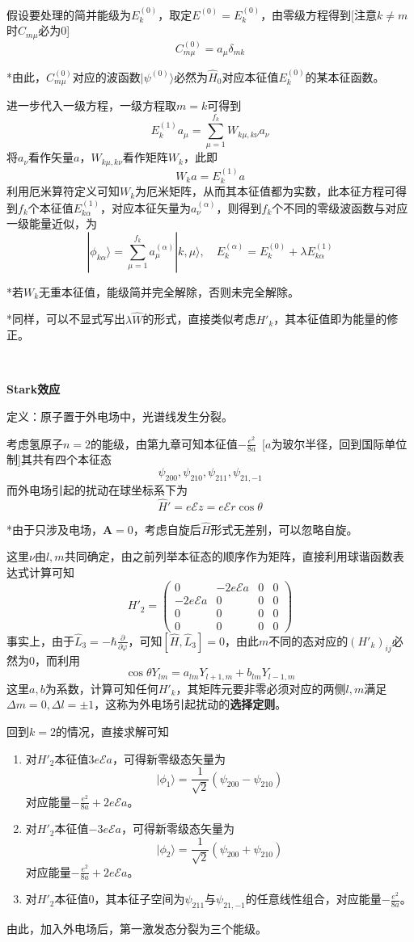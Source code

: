 \documentclass[a4paper,UTF8,fontset=windows]{ctexart}
\newcommand*{\ket}[1]{|#1\rangle}
\newcommand*{\ba}{\mathbf{A}}
\begin{document}
假设要处理的简并能级为$E_k^{(0)}$，取定$E^{(0)}=E_k^{(0)}$，由零级方程得到[注意$k\ne m$时$C_{m\mu}$必为0]
$$C_{m\mu}^{(0)}=a_\mu\delta_{mk}$$

*由此，$C_{m\mu}^{(0)}$对应的波函数$\ket{\psi^{(0)}}$必然为$\hat{H}_0$对应本征值$E_k^{(0)}$的某本征函数。

进一步代入一级方程，一级方程取$m=k$可得到
$$E_k^{(1)}a_\mu=\sum_{\mu=1}^{f_k}W_{k\mu,k\nu}a_\nu$$
将$a_\nu$看作矢量$a$，$W_{k\mu,k\nu}$看作矩阵$W_k$，此即
$$W_ka=E_k^{(1)}a$$
利用厄米算符定义可知$W_k$为厄米矩阵，从而其本征值都为实数，此本征方程可得到$f_k$个本征值$E_{k\alpha}^{(1)}$，对应本征矢量为$a_\nu^{(\alpha)}$，则得到$f_k$个不同的零级波函数与对应一级能量近似，为
$$\ket{\phi_{k\alpha}}=\sum_{\mu=1}^{f_k}a_\mu^{(\alpha)}\ket{k,\mu},\quad E_k^{(\alpha)}=E_k^{(0)}+\lambda E_{k\alpha}^{(1)}$$

*若$W_k$无重本征值，能级简并完全解除，否则未完全解除。

*同样，可以不显式写出$\lambda\hat{W}$的形式，直接类似考虑$H'_k$，其本征值即为能量的修正。

\

\textbf{Stark效应}

定义：原子置于外电场中，光谱线发生分裂。

考虑氢原子$n=2$的能级，由第九章可知本征值$-\frac{e^2}{8a}$\ [$a$为玻尔半径，回到国际单位制]其共有四个本征态
$$\psi_{200},\psi_{210},\psi_{211},\psi_{21,-1}$$
而外电场引起的扰动在球坐标系下为
$$\hat{H}'=e\mathcal{E}z=e\mathcal{E}r\cos\theta$$

*由于只涉及电场，$\ba=0$，考虑自旋后$\hat{H}$形式无差别，可以忽略自旋。

这里$\nu$由$l,m$共同确定，由之前列举本征态的顺序作为矩阵，直接利用球谐函数表达式计算可知
$$H'_2=\begin{pmatrix}0&-2e\mathcal{E}a&0&0\\-2e\mathcal{E}a&0&0&0\\0&0&0&0\\0&0&0&0\end{pmatrix}$$
事实上，由于$\hat{L}_3=-\hbar\frac{\partial}{\partial\varphi}$，可知$[\hat{H},\hat{L}_3]=0$，由此$m$不同的态对应的$(H'_k)_{ij}$必然为0，而利用$$\cos\theta Y_{lm}=a_{lm}Y_{l+1,m}+b_{lm}Y_{l-1,m}$$
这里$a,b$为系数，计算可知任何$H'_k$，其矩阵元要非零必须对应的两侧$l,m$满足$\Delta m=0,\Delta l=\pm1$，这称为外电场引起扰动的\textbf{选择定则}。

回到$k=2$的情况，直接求解可知
\begin{enumerate}
    \item 对$H'_2$本征值$3e\mathcal{E}a$，可得新零级态矢量为
    $$\ket{\phi_1}=\frac{1}{\sqrt2}(\psi_{200}-\psi_{210})$$
    对应能量$-\frac{e^2}{8a}+2e\mathcal{E}a$。

    \item 对$H'_2$本征值$-3e\mathcal{E}a$，可得新零级态矢量为
    $$\ket{\phi_2}=\frac{1}{\sqrt2}(\psi_{200}+\psi_{210})$$
    对应能量$-\frac{e^2}{8a}+2e\mathcal{E}a$。

    \item 对$H'_2$本征值0，其本征子空间为$\psi_{211}$与$\psi_{21,-1}$的任意线性组合，对应能量$-\frac{e^2}{8a}$。
\end{enumerate}
由此，加入外电场后，第一激发态分裂为三个能级。
\end{document}
